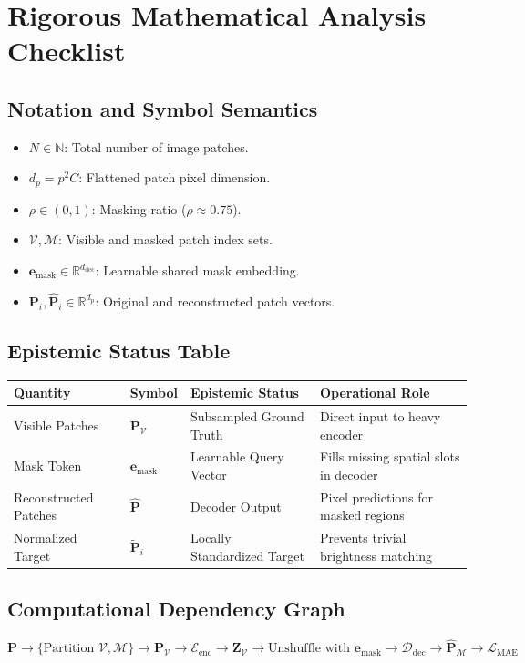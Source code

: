 \documentclass[11pt,a4paper]{article}
\theoremstyle{definition}
\begin{document}
\section{Rigorous Mathematical Analysis Checklist}

\subsection{Notation and Symbol Semantics}
\begin{itemize}
    \item $N \in \mathbb{N}$: Total number of image patches.
    \item $d_p = p^2 C$: Flattened patch pixel dimension.
    \item $\rho \in (0, 1)$: Masking ratio ($\rho \approx 0.75$).
    \item $\mathcal{V}, \mathcal{M}$: Visible and masked patch index sets.
    \item $\mathbf{e}_{\text{mask}} \in \mathbb{R}^{d_{\text{dec}}}$: Learnable shared mask embedding.
    \item $\mathbf{P}_i, \hat{\mathbf{P}}_i \in \mathbb{R}^{d_p}$: Original and reconstructed patch vectors.
\end{itemize}

\subsection{Epistemic Status Table}
\begin{table}[h]
\centering
\small
\begin{tabular}{@{}llll@{}}
\toprule
\textbf{Quantity} & \textbf{Symbol} & \textbf{Epistemic Status} & \textbf{Operational Role} \\
\midrule
Visible Patches & $\mathbf{P}_{\mathcal{V}}$ & Subsampled Ground Truth & Direct input to heavy encoder \\
Mask Token & $\mathbf{e}_{\text{mask}}$ & Learnable Query Vector & Fills missing spatial slots in decoder \\
Reconstructed Patches & $\hat{\mathbf{P}}$ & Decoder Output & Pixel predictions for masked regions \\
Normalized Target & $\tilde{\mathbf{P}}_i$ & Locally Standardized Target & Prevents trivial brightness matching \\
\bottomrule
\end{tabular}
\end{table}

\subsection{Computational Dependency Graph}
{\centering
$\mathbf{P} \longrightarrow \{\text{Partition } \mathcal{V}, \mathcal{M}\} \longrightarrow \mathbf{P}_{\mathcal{V}} \longrightarrow \mathcal{E}_{\text{enc}} \longrightarrow \mathbf{Z}_{\mathcal{V}} \longrightarrow \text{Unshuffle with } \mathbf{e}_{\text{mask}} \longrightarrow \mathcal{D}_{\text{dec}} \longrightarrow \hat{\mathbf{P}}_{\mathcal{M}} \longrightarrow \mathcal{L}_{\text{MAE}}$
\par}
\end{document}
